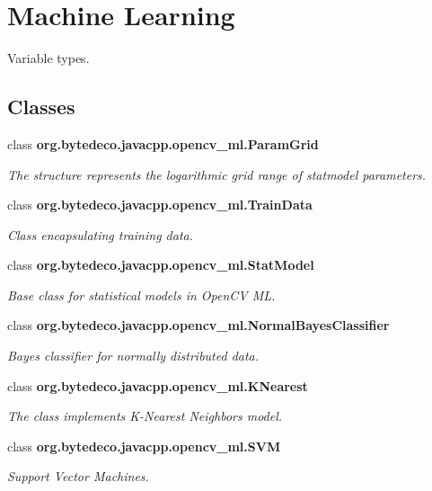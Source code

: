 \hypertarget{group__ml}{}\section{Machine Learning}
\label{group__ml}


Variable types.  


\subsection*{Classes}
\begin{DoxyCompactItemize}
\item 
class {\bfseries org.\+bytedeco.\+javacpp.\+opencv\+\_\+ml.\+Param\+Grid}
\begin{DoxyCompactList}\small\item\em The structure represents the logarithmic grid range of statmodel parameters. \end{DoxyCompactList}\item 
class {\bfseries org.\+bytedeco.\+javacpp.\+opencv\+\_\+ml.\+Train\+Data}
\begin{DoxyCompactList}\small\item\em Class encapsulating training data. \end{DoxyCompactList}\item 
class {\bfseries org.\+bytedeco.\+javacpp.\+opencv\+\_\+ml.\+Stat\+Model}
\begin{DoxyCompactList}\small\item\em Base class for statistical models in Open\+CV ML. \end{DoxyCompactList}\item 
class {\bfseries org.\+bytedeco.\+javacpp.\+opencv\+\_\+ml.\+Normal\+Bayes\+Classifier}
\begin{DoxyCompactList}\small\item\em Bayes classifier for normally distributed data. \end{DoxyCompactList}\item 
class {\bfseries org.\+bytedeco.\+javacpp.\+opencv\+\_\+ml.\+K\+Nearest}
\begin{DoxyCompactList}\small\item\em The class implements K-\/\+Nearest Neighbors model. \end{DoxyCompactList}\item 
class {\bfseries org.\+bytedeco.\+javacpp.\+opencv\+\_\+ml.\+S\+VM}
\begin{DoxyCompactList}\small\item\em Support Vector Machines. \end{DoxyCompactList}\item 

\end{DoxyCompactItemize}
